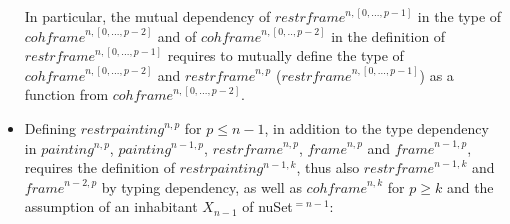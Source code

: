 \documentclass{article}
\newcommand{\myframe}{\mathit{frame}}
\newcommand{\painting}{\mathit{painting}}
\newcommand{\restrframe}{\mathit{restrframe}}
\newcommand{\restrpainting}{\mathit{restrpainting}}
\newcommand{\cohframe}{\mathit{cohframe}}
\begin{document}
\begin{itemize}
        In particular, the mutual dependency of $\restrframe^{n,[0,...,p-1]}$
        in the type of $\cohframe^{n,[0,...,p-2]}$ and of
        $\cohframe^{n,[0,..,p-2]}$ in the definition of
        $\restrframe^{n,[0,...,p-1]}$ requires to mutually define the type of
        $\cohframe^{n,[0,...,p-2]}$ and $\restrframe^{n,p}$
        ($\restrframe^{n,[0,...,p-1]}$) as a function from
        $\cohframe^{n,[0,...,p-2]}$.

  \item Defining $\restrpainting^{n,p}$ for $p\leq n-1$, in addition to
        the type dependency in $\painting^{n,p}$, $\painting^{n-1,p}$, $\restrframe^{n,p}$, $\myframe^{n,p}$ and
        $\myframe^{n-1,p}$, requires the definition of $\restrpainting^{n-1,k}$,
        thus also $\restrframe^{n-1,k}$ and $\myframe^{n-2,p}$ by typing
        dependency, as well as $\cohframe^{n,k}$ for $p \geq k$ and the
        assumption of an inhabitant $X_{n-1}$ of nuSet$^{=n-1}$:
        \begin{center}
        \end{center}


\end{itemize}
\end{document}
